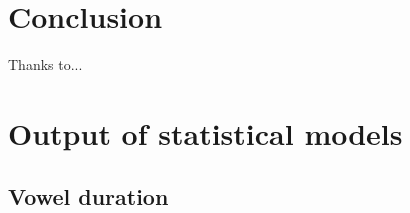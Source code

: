 \documentclass[preprint]{JASAnew}
\begin{document}
\hypertarget{conclusion}{%
\section{Conclusion}\label{conclusion}}

\begin{acknowledgments}
Thanks to...
\end{acknowledgments}

\appendix

\hypertarget{output-of-statistical-models}{%
\section{Output of statistical
models}\label{output-of-statistical-models}}

\label{a:stats}

\hypertarget{vowel-duration-1}{%
\subsection{Vowel duration}\label{vowel-duration-1}}

\scriptsize
\end{document}
